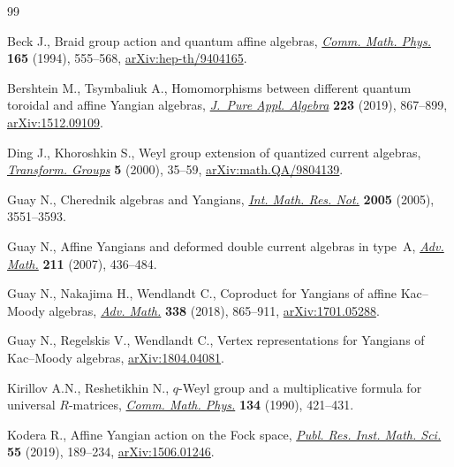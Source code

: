 \begin{thebibliography}{99}
\footnotesize\itemsep=0pt

Beck J., Braid group action and quantum affine algebras, \href{https://doi.org/10.1007/BF02099423}{\textit{Comm. Math.
 Phys.}} \textbf{165} (1994), 555--568, \href{https://arxiv.org/abs/hep-th/9404165}{arXiv:hep-th/9404165}.

Bershtein M., Tsymbaliuk A., Homomorphisms between different quantum toroidal
 and affine {Y}angian algebras, \href{https://doi.org/10.1016/j.jpaa.2018.05.003}{\textit{J.~Pure Appl. Algebra}} \textbf{223}
 (2019), 867--899, \href{https://arxiv.org/abs/1512.09109}{arXiv:1512.09109}.

Ding J., Khoroshkin S., Weyl group extension of quantized current algebras,
 \href{https://doi.org/10.1007/BF01237177}{\textit{Transform. Groups}} \textbf{5} (2000), 35--59,
 \href{https://arxiv.org/abs/math.QA/9804139}{arXiv:math.QA/9804139}.

Guay N., Cherednik algebras and {Y}angians, \href{https://doi.org/10.1155/IMRN.2005.3551}{\textit{Int. Math. Res. Not.}}
 \textbf{2005} (2005), 3551--3593.

Guay N., Affine {Y}angians and deformed double current algebras in type~{A},
 \href{https://doi.org/10.1016/j.aim.2006.08.007}{\textit{Adv. Math.}} \textbf{211} (2007), 436--484.

Guay N., Nakajima H., Wendlandt C., Coproduct for {Y}angians of affine
 {K}ac--{M}oody algebras, \href{https://doi.org/10.1016/j.aim.2018.09.013}{\textit{Adv. Math.}} \textbf{338} (2018), 865--911,
 \href{https://arxiv.org/abs/1701.05288}{arXiv:1701.05288}.

Guay N., Regelskis V., Wendlandt C., Vertex representations for {Y}angians of
 {K}ac--{M}oody algebras, \href{https://arxiv.org/abs/1804.04081}{arXiv:1804.04081}.

Kirillov A.N., Reshetikhin N., {$q$}-{W}eyl group and a multiplicative formula
 for universal {$R$}-matrices, \href{https://doi.org/10.1007/BF02097710}{\textit{Comm. Math. Phys.}} \textbf{134} (1990),
 421--431.

Kodera R., Affine {Y}angian action on the {F}ock space, \href{https://doi.org/10.4171/PRIMS/55-1-6}{\textit{Publ. Res.
 Inst. Math. Sci.}} \textbf{55} (2019), 189--234, \href{https://arxiv.org/abs/1506.01246}{arXiv:1506.01246}.


\end{thebibliography}
